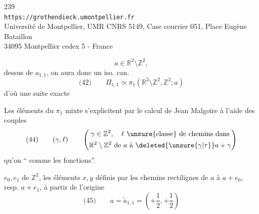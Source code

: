 \begin{center}
239\\
\texttt{https://grothendieck.umontpellier.fr}\\
Université de Montpellier, UMR CNRS 5149, Case courrier 051, Place Eugène Bataillon\\
34095 Montpellier cedex 5 - France
\end{center}

\[
a\in\mathbb R^2\setminus\mathbb Z^2,
\]
 dessus de $a_{1,1}$, on aura donc un iso. can.
\[
\text{(42)}\qquad
\Pi_{1,1}\simeq\pi_1(\mathbb R^2\setminus\mathbb Z^2,\mathbb Z^2;a)
\]
d'où une suite exacte

Les éléments du $\pi_1$ mixte s'explicitent par le calcul de Jean Malgoire à l'aide des couples
\[
\text{(44)}\qquad
(\gamma,\ell)\qquad
\left(\begin{gathered}
\gamma\in\mathbb Z^2,\quad \ell\ \text{\unsure{classe} de chemins dans}\\
\mathbb R^2\setminus\mathbb Z^2\ \text{de }a\text{ à }\deleted{\unsure{\gamma|\tau}}a+\gamma
\end{gathered}\right)
\]
qu'on `` comme les fonctions''.

$e_0,e_1$ de $\mathbb Z^2$, les éléments $x,y$ définis par les chemins rectilignes de $a$ à $a+e_0$, resp. $a+e_1$, à partir de l'origine
\[
\text{(45)}\qquad
 a=\widetilde a_{1,1}=\left(+\frac12,+\frac12\right)
\]

